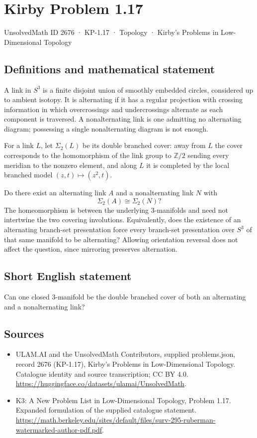 \documentclass[11pt,a4paper]{article}
\begin{document}
\section*{Kirby Problem 1.17}\label{2676}
{\small UnsolvedMath ID 2676 · KP-1.17 · Topology · Kirby's Problems in Low-Dimensional Topology}
\subsection{Definitions and mathematical statement}
A link in $S^3$ is a finite disjoint union of smoothly embedded circles, considered
up to ambient isotopy. It is alternating if it has a regular projection with
crossing information in which overcrossings and undercrossings alternate as each
component is traversed. A nonalternating link is one admitting no alternating
diagram; possessing a single nonalternating diagram is not enough.

For a link $L$, let $\Sigma_2(L)$ be its double branched cover: away from $L$ the
cover corresponds to the homomorphism of the link group to $\mathbb Z/2$ sending
every meridian to the nonzero element, and along $L$ it is completed by the local
branched model $(z,t)\mapsto(z^2,t)$.

Do there exist an alternating link $A$ and a nonalternating link $N$ with
\[
\Sigma_2(A)\cong\Sigma_2(N)?
\]
The homeomorphism is between the underlying $3$-manifolds and need not intertwine
the two covering involutions. Equivalently, does the existence of an alternating
branch-set presentation force every branch-set presentation over $S^3$ of that
same manifold to be alternating? Allowing orientation reversal does not affect
the question, since mirroring preserves alternation.
\subsection{Short English statement}
Can one closed $3$-manifold be the double branched cover of both an alternating and a nonalternating link?
\subsection{Sources}
\begin{itemize}
\item[S1] ULAM.AI and the UnsolvedMath Contributors, supplied problems.json, record 2676 (KP-1.17), Kirby's Problems in Low-Dimensional Topology. Catalogue identity and source transcription; CC BY 4.0.
\url{https://huggingface.co/datasets/ulamai/UnsolvedMath}.
\item[S2] K3: A New Problem List in Low-Dimensional Topology, Problem 1.17. Expanded formulation of the supplied catalogue statement.
\url{https://math.berkeley.edu/sites/default/files/surv-295-ruberman-watermarked-author-pdf.pdf}.
\end{itemize}
\end{document}
